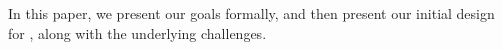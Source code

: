 \documentclass{sig-alternate}
\begin{document}
In this paper, we present our goals formally, and then present our initial design for \VizRecDB, along with the underlying challenges.









\end{document}
